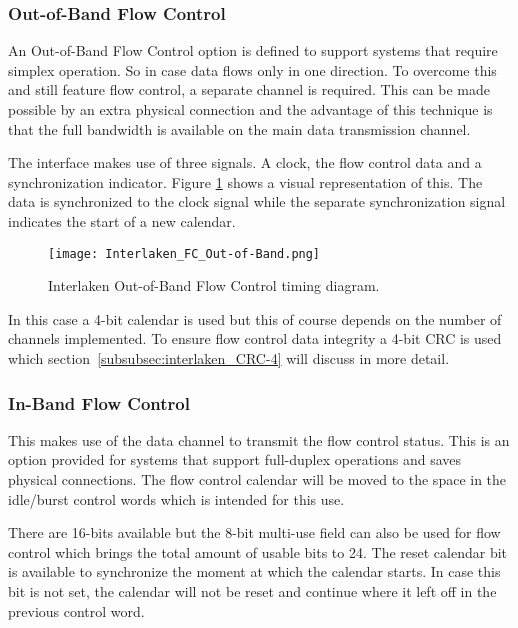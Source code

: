 	\subsubsection{Out-of-Band Flow Control}
	An Out-of-Band Flow Control option is defined to support systems that require simplex operation. So in case data flows only in one direction. To overcome this and still feature flow control, a separate channel is required. This can be made possible by an extra physical connection and the advantage of this technique is that the full bandwidth is available on the main data transmission channel. 
	
	The interface makes use of three signals. A clock, the flow control data and a synchronization indicator. Figure \ref{Fig:Interlaken_FC_Out-of-Band}\cite{InterlakenProtocol} shows a visual representation of this. The data is synchronized to the clock signal while the separate synchronization signal indicates the start of a new calendar.
	
	\begin{figure}[H]
		\centering
		\texttt{[image: Interlaken\_FC\_Out-of-Band.png]}	
		\caption{Interlaken Out-of-Band Flow Control timing diagram.}
		\label{Fig:Interlaken_FC_Out-of-Band}
	\end{figure}
	
	In this case a 4-bit calendar is used but this of course depends on the number of channels implemented. To ensure flow control data integrity a 4-bit CRC is used which section~\ref{subsubsec:interlaken_CRC-4} will discuss in more detail.
		
	
	\subsubsection{In-Band Flow Control}
	This makes use of the data channel to transmit the flow control status. This is an option provided for systems that support full-duplex operations and saves physical connections. The flow control calendar will be moved to the space in the idle/burst control words which is intended for this use.
	
	There are 16-bits available but the 8-bit multi-use field can also be used for flow control which brings the total amount of usable bits to 24. The reset calendar bit is available to synchronize the moment at which the calendar starts. In case this bit is not set, the calendar will not be reset and continue where it left off in the previous control word.
	

